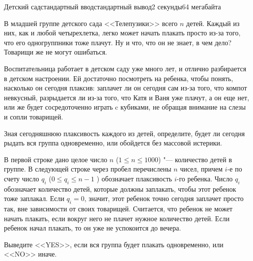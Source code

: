 \begin{problem}{Детский сад}{стандартный ввод}{стандартный вывод}{2 секунды}{64 мегабайта}

В младшей группе детского сада <<Телепузики>> всего $n$ детей. Каждый из них, как и любой четырехлетка, легко может начать плакать просто из-за того, что его одногруппники тоже плачут. Ну и что, что он не знает, в чем дело? Товарищи же не могут ошибаться. 

Воспитательница работает в детском саду уже много лет, и отлично разбирается в детском настроении. Ей достаточно посмотреть на ребенка, чтобы понять, насколько он сегодня плаксив: заплачет ли он сегодня сам из-за того, что компот невкусный, разрыдается ли из-за того, что Катя и Ваня уже плачут, а он еще нет, или же будет сосредоточенно играть c кубиками, не обращая внимание на слезы и сопли товарищей. 

Зная сегодняшнюю плаксивость каждого из детей, определите, будет ли сегодня рыдать вся группа одновременно, или обойдется без массовой истерики. 


\InputFile
В первой строке дано целое число $n$ ($ 1 \leqslant n \leqslant 1000$) "--- количество детей в группе.
В следующей строке через пробел перечислены $n$ чисел, причем $i$-е по счету число $q_i$ ($0 \leqslant q_i \leqslant n-1$ ) обозначает плаксивость $i$-го ребенка.  Число $q_i$ обозначает количество детей, которые должны заплакать, чтобы этот ребенок тоже заплакал. Если $q_i = 0$, значит, этот ребенок точно сегодня заплачет просто так, вне зависимости от своих товарищей. Считается, что ребенок не может начать плакать, если вокруг него не плачет нужное количество детей. Если ребенок начал плакать, то он уже не успокоится до вечера. 


\OutputFile
Выведите <<YES>>, если вся группа будет плакать одновременно, или <<NO>> иначе.   

\Examples

\begin{example}
%
%
\end{example}

\end{problem}
